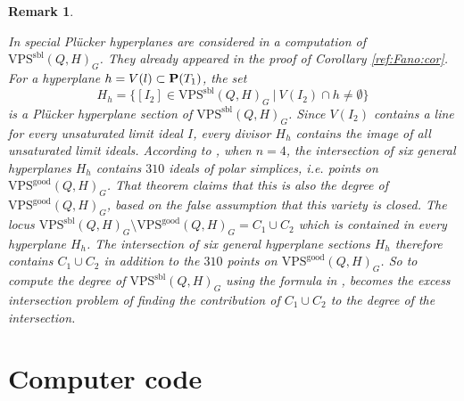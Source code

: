 \documentclass{amsart}
\newcommand{\PP}{{\bf P}}
\newcommand{\VPSsbl}{{\mathrm{VPS}}^{\mathrm{sbl}}(Q, H)}
\newcommand{\VPSgood}{{\mathrm{VPS}}^{\mathrm{good}}(Q, H)}
\newtheorem{remark}[lemma]{\bf Remark}
\begin{document}
\begin{remark}\label{excess}  {\rm

In \cite{RS} special Pl\"ucker hyperplanes are considered in a computation of $\VPSsbl_G$. They already appeared in the proof of  Corollary \ref{ref:Fano:cor}.
For a hyperplane $h=V(l)\subset \PP(T_1)$, the set
$$H_h=\{[I_2]\in \VPSsbl_G\ |\ V(I_2)\cap h\not= \emptyset\}$$
is a  Pl\"ucker hyperplane section of  $\VPSsbl_G$.
Since $V(I_2)$ contains a line for every unsaturated limit ideal $I$, every divisor $H_h$ contains the image of all unsaturated limit
ideals.
According to \cite[Theorem 6.3]{RS}, when $n=4$, the intersection of six general hyperplanes $H_h$ contains $310$ ideals of
polar simplices, i.e. points on $\VPSgood_G$.  That theorem claims that this is also the degree of $\VPSgood_G$, based on the false assumption that this variety is closed. The locus $\VPSsbl_G\setminus \VPSgood_G=C_1\cup C_2$ which is contained in every hyperplane $H_h$.
The intersection of six general hyperplane sections $H_h$ therefore contains $C_1\cup C_2$ in addition to the $310$ points on $\VPSgood_G$. So to compute the degree of $\VPSsbl_G$ using the formula in \cite[Theorem 6.3]{RS}, becomes the excess intersection problem of finding the contribution of $C_1\cup C_2$ to the degree of the intersection.
}
\end{remark}

\appendix
\section{Computer code}\label{sec:computerPart}
\end{document}
